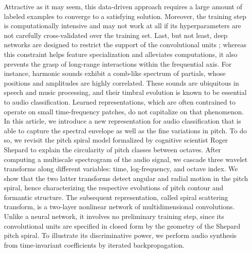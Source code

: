 \documentclass{article}
\begin{document}
Attractive as it may seem, this data-driven approach requires a large amount of labeled examples to converge to a satisfying solution.
Moreover, the training step is computationally intensive and may not work at all if its hyperparameters are not carefully cross-validated over the training set. 
Last, but not least, deep networks are designed to restrict the support of the convolutional units ; whereas this constraint helps feature specialization and alleviates computations, it also prevents the grasp of long-range interactions within the frequential axis.
For instance, harmonic sounds exhibit a comb-like spectrum of partials, whose positions and amplitudes are highly correlated.
These sounds are ubiquitous in speech and music processing, and their timbral evolution is known to be essential to audio classification.
Learned representations, which are often contrained to operate on small time-frequency patches, do not capitalize on that phenomenon.
In this article, we introduce a new representation for audio classification that is able to capture the spectral envelope as well as the fine variations in pitch.
To do so, we revisit the pitch spiral model formalized by cognitive scientist Roger Shepard to explain the circularity of pitch classes between octaves.
After computing a multiscale spectrogram of the audio signal, we cascade three wavelet transforms along different variables: time, log-frequency, and octave index.
We show that the two latter transforms detect angular and radial motion in the pitch spiral, hence characterizing the respective evolutions of pitch contour and formantic structure.
The subsequent representation, called spiral scattering transform, is a two-layer nonlinear network of multidimensional convolutions.
Unlike a neural network, it involves no preliminary training step, since its convolutional units are specified in closed form by the geometry of the Shepard pitch spiral.
To illustrate its discriminative power, we perform audio synthesis from time-invariant coefficients by iterated backpropagation.



\section{}
\end{document}
